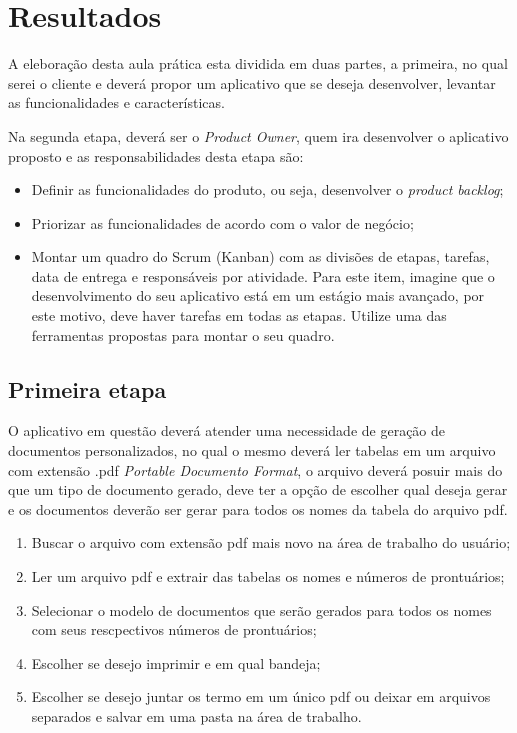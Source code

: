 \section{Resultados}
\par A eleboração desta aula prática esta dividida em duas partes, a primeira, no qual serei o cliente e deverá propor um aplicativo que se deseja desenvolver, levantar as funcionalidades e características.
\par Na segunda etapa, deverá ser o \textit{Product Owner}, quem ira desenvolver o aplicativo proposto e as responsabilidades desta etapa são:
\begin{itemize}
  \item Definir as funcionalidades do produto, ou seja, desenvolver o \textit{product backlog};
  \item Priorizar as funcionalidades de acordo com o valor de negócio;
  \item Montar um quadro do Scrum (Kanban) com as divisões de etapas, tarefas, data de entrega e responsáveis por atividade. Para este item, imagine que o desenvolvimento do seu aplicativo está em um estágio mais avançado, por este motivo, deve haver tarefas em todas as etapas. Utilize uma das ferramentas propostas para montar o seu quadro.
\end{itemize}

\subsection{Primeira etapa}
\par O aplicativo em questão deverá atender uma necessidade de geração de documentos personalizados, no qual o mesmo deverá ler tabelas em um arquivo com extensão .pdf \textit{Portable Documento Format}, o arquivo deverá posuir mais do que um tipo de documento gerado, deve ter a opção de escolher qual deseja gerar e os documentos deverão ser gerar para todos os nomes da tabela do arquivo pdf.
\begin{enumerate}
  \item Buscar o arquivo com extensão pdf mais novo na área de trabalho do usuário;
  \item Ler um arquivo pdf e extrair das tabelas os nomes e números de prontuários;
  \item Selecionar o modelo de documentos que serão gerados para todos os nomes com seus rescpectivos números de prontuários;
  \item Escolher se desejo imprimir e em qual bandeja;
  \item Escolher se desejo juntar os termo em um único pdf ou deixar em arquivos separados e salvar em uma pasta na área de trabalho.

\end{enumerate}\label{productlog}

